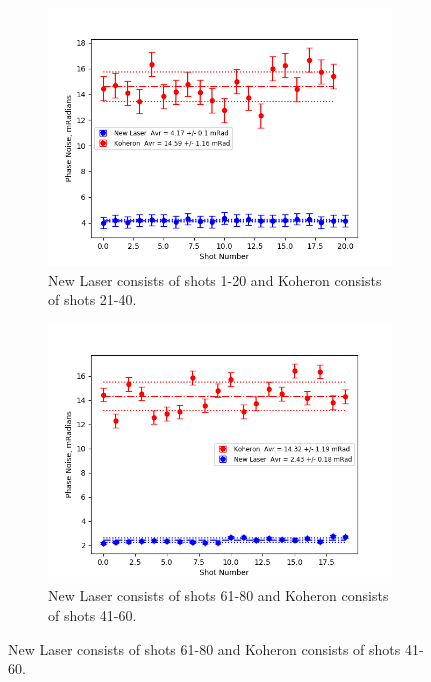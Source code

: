 \documentclass[12pt,a4paper,oneside]{report}
\begin{document}
\begin{figure}[H] 
  \begin{subfigure}{.5\textwidth}
    \centering\captionsetup{width=.9\linewidth}
    \includegraphics[width=\textwidth, angle=0]{DImages/Phase_Noise_for_Shots_1and_2.png}
    \caption{New Laser consists of shots 1-20 and Koheron consists of shots 21-40.}
  \end{subfigure}
  \begin{subfigure}{.5\textwidth}
    \centering\captionsetup{width=.9\linewidth}
    \includegraphics[width=\textwidth, angle=0]{DImages/Phase_Noise_for_Shots_3and_4.png}
    \caption{New Laser consists of shots 61-80 and Koheron consists of shots 41-60.}
  \end{subfigure}

\end{figure}
\end{document}

